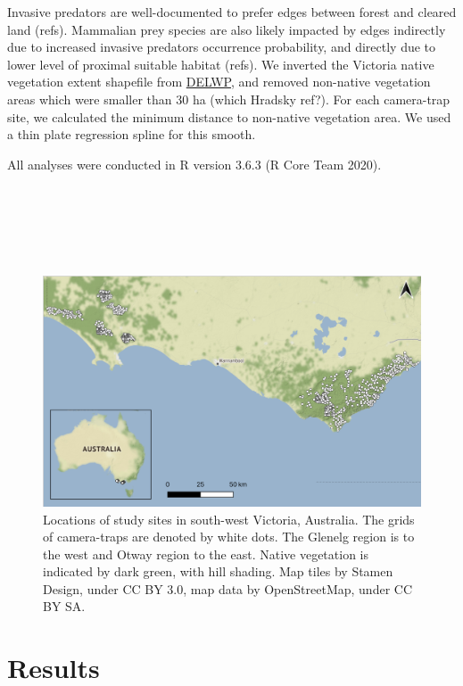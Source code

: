 \documentclass[11pt,a4paper,titlepage,twoside,openright]{style/unimelbthesis}
\begin{document}
\begin{mainmatter}
Invasive predators are well-documented to prefer edges between forest and cleared land (refs). Mammalian prey species are also likely impacted by edges indirectly due to increased invasive predators occurrence probability, and directly due to lower level of proximal suitable habitat (refs). We inverted the Victoria native vegetation extent shapefile from \href{\%22https://discover.data.vic.gov.au/dataset/native-vegetation-modelled-2005-ecological-vegetation-classes-with-bioregional-conservation-sta\%22}{DELWP}, and removed non-native vegetation areas which were smaller than 30 ha (which Hradsky ref?). For each camera-trap site, we calculated the minimum distance to non-native vegetation area. We used a thin plate regression spline for this smooth.

All analyses were conducted in R version 3.6.3 (R Core Team 2020).

\newpage

\(~\)

\(~\)

\(~\)
\begin{figure}

{\centering \includegraphics[width=1\linewidth]{figure/map_cams} 

}

\caption{Locations of study sites in south-west Victoria, Australia. The grids of camera-traps are denoted by white dots. The Glenelg region is to the west and Otway region to the east. Native vegetation is indicated by dark green, with hill shading. Map tiles by Stamen Design, under CC BY 3.0, map data by OpenStreetMap, under CC BY SA.}\label{fig:occ-map}
\end{figure}
\newpage

\hypertarget{results-1}{%
\section{Results}\label{results-1}}


\end{mainmatter}
\end{document}
